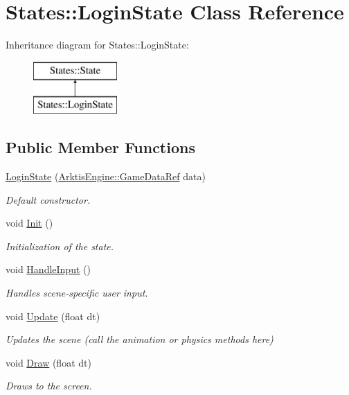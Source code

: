 \hypertarget{class_states_1_1_login_state}{}\section{States\+::Login\+State Class Reference}
\label{class_states_1_1_login_state}
Inheritance diagram for States\+::Login\+State\+:\begin{figure}[H]
\begin{center}
\leavevmode
\includegraphics[height=2.000000cm]{class_states_1_1_login_state}
\end{center}
\end{figure}
\subsection*{Public Member Functions}
\begin{DoxyCompactItemize}
\item 
\mbox{\hyperlink{class_states_1_1_login_state_a73147b21ae7bc566d4394a25881e887b}{Login\+State}} (\mbox{\hyperlink{namespace_arktis_engine_a52e783ae007274e2a6eccc201d9400a5}{Arktis\+Engine\+::\+Game\+Data\+Ref}} data)
\begin{DoxyCompactList}\small\item\em Default constructor. \end{DoxyCompactList}\item 
void \mbox{\hyperlink{class_states_1_1_login_state_abe7a51211f07fe9eeac422f548117b49}{Init}} ()
\begin{DoxyCompactList}\small\item\em Initialization of the state. \end{DoxyCompactList}\item 
void \mbox{\hyperlink{class_states_1_1_login_state_a91cc904bfbe100def4cb967f089175f7}{Handle\+Input}} ()
\begin{DoxyCompactList}\small\item\em Handles scene-\/specific user input. \end{DoxyCompactList}\item 
void \mbox{\hyperlink{class_states_1_1_login_state_a026b040b86a5f4f0c3855fb5d5aef0ce}{Update}} (float dt)
\begin{DoxyCompactList}\small\item\em Updates the scene (call the animation or physics methods here) \end{DoxyCompactList}\item 
void \mbox{\hyperlink{class_states_1_1_login_state_aca115316c1aa308f39c6c95c47fd30f6}{Draw}} (float dt)
\begin{DoxyCompactList}\small\item\em Draws to the screen. \end{DoxyCompactList}\end{DoxyCompactItemize}


